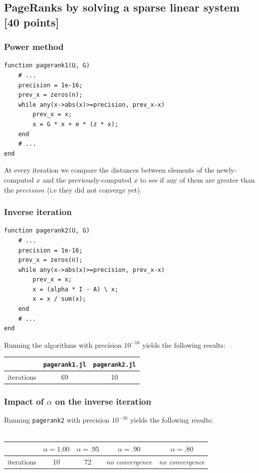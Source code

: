 \documentclass[unicode,11pt,a4paper,oneside,numbers=endperiod,openany]{scrartcl}
\begin{document}
\subsection{PageRanks by solving a sparse linear system [40 points]}
\subsubsection{Power method}
\begin{verbatim}
function pagerank1(U, G)
    # ...
    precision = 1e-16;
    prev_x = zeros(n);
    while any(x->abs(x)>=precision, prev_x-x)
        prev_x = x;
        x = G * x + e * (z * x);
    end
    # ...
end
\end{verbatim}
At every iteration we compare the distances between elements of the newly-computed $x$ and the previously-computed $x$ to see if any of them are greater than the $precision$ (i.e they did not converge yet).

\subsubsection{Inverse iteration}
\begin{verbatim}
function pagerank2(U, G)
    # ...
    precision = 1e-16;
    prev_x = zeros(n);
    while any(x->abs(x)>=precision, prev_x-x)
        prev_x = x;
        x = (alpha * I - A) \ x;
        x = x / sum(x);
    end
    # ...
end
\end{verbatim}

Running the algorithms with precision $10^{-16}$ yields the following results:\\
\begin{tabular}{l|c|c}
     & \texttt{pagerank1.jl} & \texttt{pagerank2.jl}\\
     \hline iterations & 69 & 10
\end{tabular}



\subsubsection{Impact of $\alpha$ on the inverse iteration}
Running \texttt{pagerank2} with precision $10^{-16}$ yields the following results:\\\\
\begin{tabular}{c|c|c|c|c} 
      &  $\alpha=1.00$ & $\alpha=.95$ & $\alpha=.90$ & $\alpha=.80$\\
     \hline iterations & 10 & 72 & \textit{no convergence} & \textit{no convergence}
\end{tabular}\\
\end{document}
